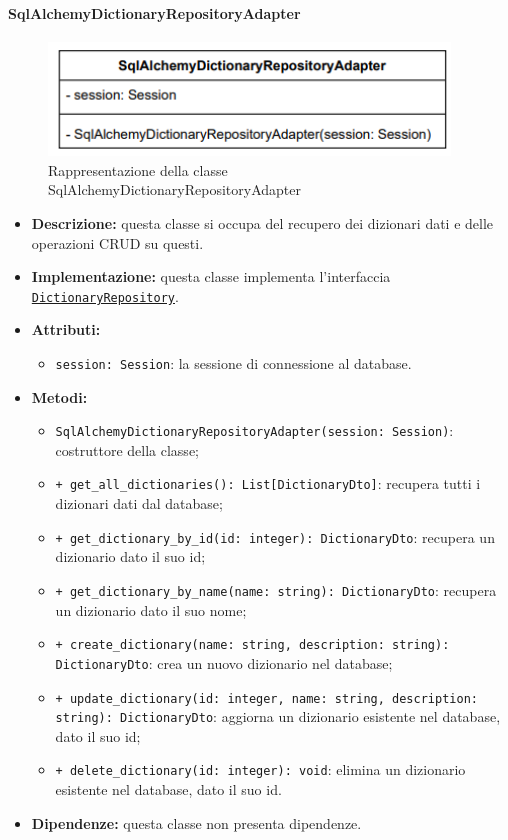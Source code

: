 \paragraph{SqlAlchemyDictionaryRepositoryAdapter} \label{SqlAlchemyDictionaryRepositoryAdapter}
\begin{figure}[H]
    \centering
    \includegraphics[width=0.95\textwidth]{assets/Backend/sql_alchemy_dictionary_repository_adapter.png}
    \caption{Rappresentazione della classe SqlAlchemyDictionaryRepositoryAdapter}
  \end{figure}
\begin{itemize}
    \item \textbf{Descrizione:} questa classe si occupa del recupero dei dizionari dati e delle operazioni CRUD su questi.
    \item \textbf{Implementazione:} questa classe implementa l'interfaccia \hyperref[DictionaryRepository]{\texttt{DictionaryRepository}}.
    \item \textbf{Attributi:}
    \begin{itemize}
        \item \texttt{session: Session}: la sessione di connessione al database.
    \end{itemize}
    \item \textbf{Metodi:}
    \begin{itemize}
        \item \texttt{SqlAlchemyDictionaryRepositoryAdapter(session: Session)}: costruttore della classe;
        \item \texttt{+ get\_all\_dictionaries(): List[DictionaryDto]}: recupera tutti i dizionari dati dal database;
        \item \texttt{+ get\_dictionary\_by\_id(id: integer): DictionaryDto}: recupera un dizionario dato il suo id;
        \item \texttt{+ get\_dictionary\_by\_name(name: string): DictionaryDto}: recupera un dizionario dato il suo nome;
        \item \texttt{+ create\_dictionary(name: string, description: string): DictionaryDto}: crea un nuovo dizionario nel database;
        \item \texttt{+ update\_dictionary(id: integer, name: string, description: string): DictionaryDto}: aggiorna un dizionario esistente nel database, dato il suo id;
        \item \texttt{+ delete\_dictionary(id: integer): void}: elimina un dizionario esistente nel database, dato il suo id.
    \end{itemize}
    \item \textbf{Dipendenze:} questa classe non presenta dipendenze.
\end{itemize} 

